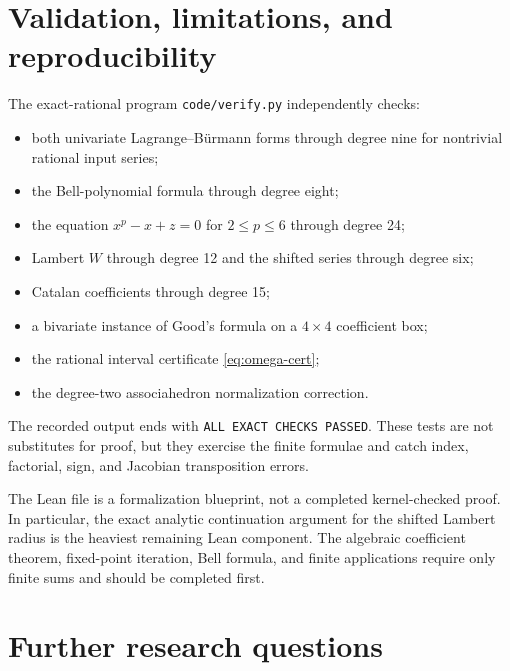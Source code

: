 \documentclass[11pt]{article}
\theoremstyle{definition}
\newcommand{\code}[1]{\texttt{#1}}
\begin{document}
\section{Validation, limitations, and reproducibility}\label{sec:validation}

The exact-rational program \code{code/verify.py} independently checks:
\begin{itemize}
\item both univariate Lagrange--B\"urmann forms through degree nine for
nontrivial rational input series;
\item the Bell-polynomial formula through degree eight;
\item the equation \(x^p-x+z=0\) for \(2\le p\le6\) through degree 24;
\item Lambert \(W\) through degree 12 and the shifted series through degree six;
\item Catalan coefficients through degree 15;
\item a bivariate instance of Good's formula on a \(4\times4\) coefficient box;
\item the rational interval certificate \eqref{eq:omega-cert};
\item the degree-two associahedron normalization correction.
\end{itemize}
The recorded output ends with \code{ALL EXACT CHECKS PASSED}.  These tests are
not substitutes for proof, but they exercise the finite formulae and catch
index, factorial, sign, and Jacobian transposition errors.

The Lean file is a formalization blueprint, not a completed kernel-checked
proof.  In particular, the exact analytic continuation argument for the shifted
Lambert radius is the heaviest remaining Lean component.  The algebraic
coefficient theorem, fixed-point iteration, Bell formula, and finite
applications require only finite sums and should be completed first.

\section{Further research questions}\label{sec:further}
\end{document}
